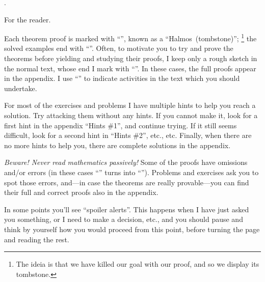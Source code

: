 
\chapterblah \prefaceterm.

\sectionblah For the reader.

Each theorem proof is marked with ``\thinspace\qedsymbol\thinspace'',
known as a ``Halmos\Halmos[tombstone]~(tombstone)'';%
\footnote{The ideia is that we have killed our goal with our proof,
and so we display its tombstone.}
the solved examples end with ``\thinspace\qexsymbol\thinspace''.
Often, to motivate you to try and prove the theorems before yielding and studying their proofs,
I keep only a rough sketch in the normal text, whose end I mark with
``\thinspace\qessymbol\thinspace''.
In these cases, the full proofs appear in the appendix.
I use ``\thinspace\activitysymbol\thinspace'' to indicate activities in the text
which you should undertake.

For most of the exercises and problems I have multiple hints to help you
reach a solution.  Try attacking them without any hints.
If you cannot make it, look for a first hint in the appendix ``Hints \#1'',
and continue trying.
If it still seems difficult, look for a second hint in ``Hints \#2'', etc., etc.
Finally, when there are no more hints to help you,
there are complete solutions in the appendix.

\emph{Beware!  Never read mathematics passively!}
Some of the proofs have omissions and/or errors
(in these cases ``\thinspace\qedsymbol\thinspace''
turns into ``\thinspace\mistakesymbol\thinspace'').
Problems and exercises ask you to spot those errors,
and---in case the theorems are really provable---you
can find their full and correct proofs also in the appendix.

In some points you'll see ``spoiler alerts''.
This happens when I have just asked you something, or I need
to make a decision, etc., and you should pause and think by yourself
how you would proceed from this point, before turning the page
and reading the rest.

\endsectionblah

\endchapterblah
